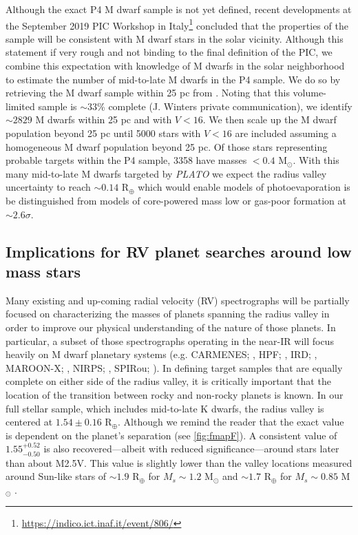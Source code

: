 \documentclass[twocolumn]{emulateapj}
\newcommand{\plato}[1]{\emph{PLATO}#1}
\begin{document}
Although the exact P4 M dwarf sample is not yet defined, recent developments
at the September 2019 PIC Workshop in Italy\footnote{\url{https://indico.ict.inaf.it/event/806/}} concluded that the
properties of the sample will be consistent with M dwarf stars in the solar vicinity. Although this statement
if very rough and not binding to the final definition of the PIC, we combine this expectation with knowledge of M dwarfs
in the solar neighborhood to estimate the number of mid-to-late M dwarfs in the P4 sample. We do so by retrieving
the M dwarf sample within 25 pc from \cite{winters19}. Noting that this volume-limited sample is $\sim 33$\% complete
(J. Winters private communication), we identify $\sim 2829$ M dwarfs within 25 pc and with $V<16$.
We then scale up the M dwarf population beyond 25 pc until 5000 stars with $V<16$ are included assuming a homogeneous M
dwarf population beyond 25 pc. Of those stars representing probable targets within the P4 sample, 3358 have masses
$<0.4$ M$_{\odot}$. With this many mid-to-late M dwarfs targeted by \plato{} we expect the radius valley uncertainty
to reach $\sim 0.14$ R$_{\oplus}$ which would enable models of photoevaporation is be distinguished from models of
core-powered mass low or gas-poor formation at $\sim 2.6\sigma$.


\subsection{Implications for RV planet searches around low mass stars}
Many existing and up-coming radial velocity (RV) spectrographs
will be partially focused on characterizing the masses of planets spanning the radius valley in order to
improve our physical understanding of the nature of those planets. In particular, a subset of those spectrographs
operating in the near-IR will focus heavily on M dwarf planetary systems
(e.g. CARMENES; \citealt{quirrenbach14}, HPF; \citealt{mahadevan12}, IRD; \citealt{kotani14},
MAROON-X; \citealt{seifahrt18}, NIRPS; \citealt{bouchy17}, SPIRou; \citealt{donati18}). In defining target samples
that are equally complete on either side of the radius valley, it is critically important that the location
of the transition between rocky and non-rocky planets is known. In our full stellar sample, which includes
mid-to-late K dwarfs, the radius valley is centered at $1.54\pm 0.16$ R$_{\oplus}$. Although we remind the
reader that the exact value is dependent on the planet's separation (see \autoref{fig:fmapF}). A consistent value of
$1.55^{+0.52}_{-0.50}$ is also recovered---albeit with reduced significance---around stars later than about M2.5V.
This value is slightly lower than the valley locations measured around Sun-like stars of
$\sim 1.9$ R$_{\oplus}$ for $M_s \sim 1.2$ M$_{\odot}$ and $\sim 1.7$ R$_{\oplus}$ for $M_s \sim 0.85$ M$_{\odot}$
\citep{fulton18}.
\end{document}
